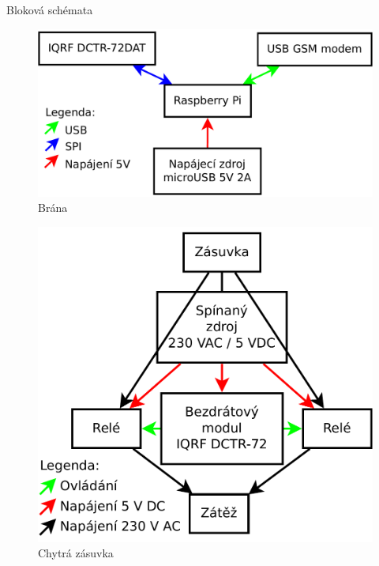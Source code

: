 \documentclass[11pt]{beamer}
\begin{document}
\begin{frame}{Bloková schémata}
  \begin{center}
      \begin{figure}
        \includegraphics[width = \textwidth]{../img/blokove-schema/brana.pdf}
        \caption{Brána}
      \end{figure}
    \endminipage
      \begin{figure}
        \includegraphics[width = \textwidth]{../img/blokove-schema/zasuvka.pdf}
        \caption{Chytrá zásuvka}
      \end{figure}
    \endminipage
  \end{center}
\end{frame}
\end{document}
